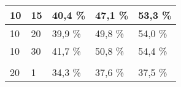 \begin{table}[!htb]
\begin{tabular}{lllll}
\multicolumn{1}{|l|}{10}                                                     & \multicolumn{1}{l|}{15}                                                                                                       & \multicolumn{1}{l|}{40,4 \%}                                                                                          & \multicolumn{1}{l|}{47,1 \%}                                                                                           & \multicolumn{1}{l|}{53,3 \%}                                                                                           \\ \hline
\multicolumn{1}{|l|}{10}                                                     & \multicolumn{1}{l|}{20}                                                                                                       & \multicolumn{1}{l|}{39,9 \%}                                                                                          & \multicolumn{1}{l|}{49,8 \%}                                                                                           & \multicolumn{1}{l|}{54,0 \%}                                                                                           \\ \hline
\multicolumn{1}{|l|}{10}                                                     & \multicolumn{1}{l|}{30}                                                                                                       & \multicolumn{1}{l|}{41,7 \%}                                                                                          & \multicolumn{1}{l|}{50,8 \%}                                                                                           & \multicolumn{1}{l|}{54,4 \%}                                                                                           \\ \hline
                                                                             &                                                                                                                               &                                                                                                                       &                                                                                                                        &                                                                                                                        \\ \hline
\multicolumn{1}{|l|}{20}                                                     & \multicolumn{1}{l|}{1}                                                                                                        & \multicolumn{1}{l|}{34,3 \%}                                                                                          & \multicolumn{1}{l|}{37,6 \%}                                                                                           & \multicolumn{1}{l|}{37,5 \%}                                                                                           \\ \hline

\end{tabular}
\end{table}
